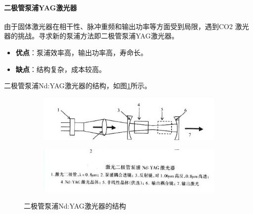 \paragraph{二极管泵浦YAG激光器}由于固体激光器在相干性、脉冲重频和输出功率等方面受到局限，遇到CO2 激光器的挑战。寻求新的泵浦方法即二极管泵浦YAG激光器。
\begin{itemize}
	\item \textbf{优点}：泵浦效率高，输出功率高，寿命长。
	\item \textbf{缺点}：结构复杂，成本较高。
\end{itemize}
二极管泵浦Nd:YAG激光器的结构，如图\ref{fig:激光二极管泵浦YAG激光器2}所示。
\begin{figure}[htbp]
	\centering
	\begin{subfigure}{0.6\linewidth}
		\includegraphics[width=\linewidth]{figure/Chapter2/激光二极管泵浦YAG激光器1}
	\end{subfigure}
	\begin{subfigure}{0.6\linewidth}
		\includegraphics[width=\linewidth]{figure/Chapter2/激光二极管泵浦YAG激光器2}
	\end{subfigure}
	\caption{二极管泵浦Nd:YAG激光器的结构}
	\label{fig:激光二极管泵浦YAG激光器2}
\end{figure}

